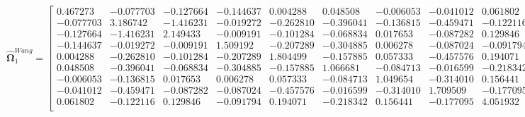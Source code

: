 \documentclass{article}\usepackage[]{graphicx}\usepackage[]{xcolor}
\def\bs{\boldsymbol}
\begin{document}
 \[
 \widehat{\bs{\Omega}}_{1}^{Wang} = 
 
  \begin{bmatrix}
 
 
 
 0.467273 & -0.077703 & -0.127664 & -0.144637 & 0.004288 & 0.048508 & -0.006053 & -0.041012 & 0.061802\\
 
 -0.077703 & 3.186742 & -1.416231 & -0.019272 & -0.262810 & -0.396041 & -0.136815 & -0.459471 & -0.122116\\
 
 -0.127664 & -1.416231 & 2.149433 & -0.009191 & -0.101284 & -0.068834 & 0.017653 & -0.087282 & 0.129846\\
 
 -0.144637 & -0.019272 & -0.009191 & 1.509192 & -0.207289 & -0.304885 & 0.006278 & -0.087024 & -0.091794\\
 
 0.004288 & -0.262810 & -0.101284 & -0.207289 & 1.804499 & -0.157885 & 0.057333 & -0.457576 & 0.194071\\
 
 0.048508 & -0.396041 & -0.068834 & -0.304885 & -0.157885 & 1.066681 & -0.084713 & -0.016599 & -0.218342\\
 
 -0.006053 & -0.136815 & 0.017653 & 0.006278 & 0.057333 & -0.084713 & 1.049654 & -0.314010 & 0.156441\\
 
 -0.041012 & -0.459471 & -0.087282 & -0.087024 & -0.457576 & -0.016599 & -0.314010 & 1.709509 & -0.177095\\
 
 0.061802 & -0.122116 & 0.129846 & -0.091794 & 0.194071 & -0.218342 & 0.156441 & -0.177095 & 4.051932\\
 
 
 \end{bmatrix}
 \]
 
\end{document}
